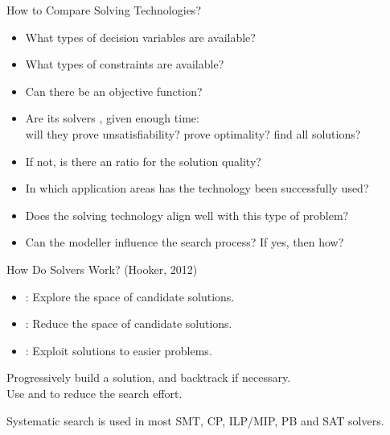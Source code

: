 \documentclass{cons-beamer}
\begin{document}
\begin{frame}{How to Compare Solving Technologies?}
  \begin{itemize}
    \item What types of decision variables are available?  %
    \item What types of constraints are available?  %
    \item Can there be an objective function?
  \end{itemize}
  \vfill

  \begin{itemize}
    \item Are its solvers , given enough time: \\ will
      they prove unsatisfiability? prove optimality? find all solutions?
    \item If not, is there an  ratio for the
      solution quality?
  \end{itemize}
  \vfill

  \begin{itemize}
    \item In which application areas has the technology been
      successfully used?
    \item Does the solving technology align well with this type of problem?
    \item Can the modeller influence the search process?  If yes, then how?
  \end{itemize}
\end{frame}

\begin{frame}{How Do Solvers Work? (Hooker, 2012)}
  \begin{definition}[Solving = Search + Inference + Relaxation]
    \begin{itemize}
      \item {}: Explore the space of candidate solutions.
      \item {}: Reduce the space of candidate solutions.
      \item {}: Exploit solutions to easier problems.
    \end{itemize}
  \end{definition}
  \vfill

  \begin{definition}
    Progressively build a solution, and backtrack if necessary. \\ Use
     and  to reduce the
    search effort.
  \end{definition} \vfill
  Systematic search is used in most SMT, CP, ILP/MIP, PB and SAT solvers.
\end{frame}
\end{document}
